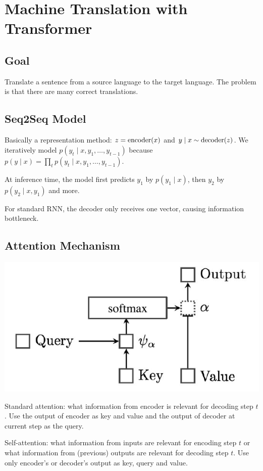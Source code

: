 \section{Machine Translation with Transformer}

\subsection*{Goal}

Translate a sentence from a source language to the target language. The problem is that there are many correct translations.

\subsection*{Seq2Seq Model}

Basically a representation method: $z=\text{encoder}(x)$ and $y\mid x \sim \text{decoder}(z)$.
We iteratively model $p(y_t\mid x, y_1, \dots, y_{t-1})$ because $p(y\mid x)=\prod_{t} p(y_t\mid x, y_1, \dots, y_{t-1})$.

At inference time, the model first predicts $y_1$ by $p(y_1\mid x)$, then $y_2$ by $p(y_2\mid x, y_1)$ and more.

For standard RNN, the decoder only receives one vector, causing information bottleneck.

\subsection*{Attention Mechanism}

\begin{center}
    \includegraphics[width=.8\columnwidth]{img/attention.png}
\end{center}
Standard attention: what information from encoder is relevant for decoding step $t$. Use the output of encoder as key and value and the output of decoder at current step as the query.

Self-attention: what information from inputs are relevant for encoding step $t$ or what
information from (previous) outputs are relevant for decoding step $t$. Use only encoder's or decoder's output as key, query and value.